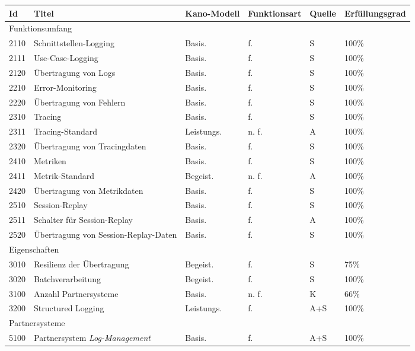 \begingroup
\centering
\setlength{\LTleft}{-20cm plus -1fill}
\setlength{\LTright}{\LTleft}
\begin{longtable}{|p{0.85cm}|p{6.2cm}|p{1.55cm}|p{1.75cm}|p{1.1cm}|p{1.8cm}|}
\hline
Id & Titel & Kano-Modell & Funktions\-art & Quelle & Erfüllungs\-grad \\
\endhead
\hline
\multicolumn{6}{|l|}{Funktionsumfang} \\
\hline
2110 & Schnittstellen-Logging & Basis. & f. & S & 100\% \\
\hline
2111 & Use-Case-Logging & Basis. & f. & S & 100\% \\
\hline
2120 & Übertragung von Logs & Basis. & f. & S & 100\% \\
\hline
2210 & Error-Monitoring & Basis. & f. & S & 100\% \\
\hline
2220 & Übertragung von Fehlern & Basis. & f. & S & 100\% \\
\hline
2310 & Tracing & Basis. & f. & S & 100\% \\
\hline
2311 & Tracing-Standard & Leistungs. & n. f. & A & 100\% \\
\hline
2320 & Übertragung von Tracingdaten & Basis. & f. & S & 100\% \\
\hline
2410 & Metriken & Basis. & f. & S & 100\% \\
\hline
2411 & Metrik-Standard & Begeist. & n. f. & A & 100\% \\
\hline
2420 & Übertragung von Metrikdaten & Basis. & f. & S & 100\% \\
\hline
2510 & Session-Replay & Basis. & f. & S & 100\% \\
\hline
2511 & Schalter für Session-Replay & Basis. & f. & A & 100\% \\
\hline
2520 & Übertragung von Session-Replay-Daten & Basis. & f. & S & 100\% \\
\hline
\multicolumn{6}{|l|}{Eigenschaften} \\
\hline
3010 & Resilienz der Übertragung & Begeist. & f. & S & 75\% \\
\hline
3020 & Batchverarbeitung & Begeist. & f. & S & 100\% \\
\hline
3100 & Anzahl Partnersysteme & Basis. & n. f. & K & 66\% \\
\hline
3200 & Structured Logging & Leistungs. & f. & A+S & 100\% \\
\hline
\multicolumn{6}{|l|}{Partnersysteme} \\
\hline
5100 & Partnersystem \textit{Log-Management} & Basis. & f. & A+S & 100\% \\

\end{longtable}
